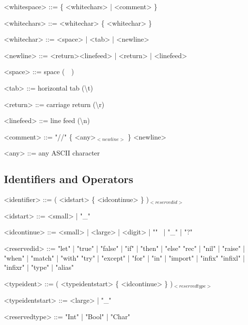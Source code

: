 \documentclass{article}
\begin{document}
\begin{grammar}
  <whitespace> ::= \{ <whitechars> | <comment> \}

  <whitechars> ::= <whitechar> \{ <whitechar> \}

  <whitechar> ::= <space> | <tab> | <newline>

  <newline> ::= <return><linefeed> | <return> | <linefeed>

  <space> ::= space (\textquotesingle \ \ \textquotesingle)

  <tab> ::= horizontal tab (\textquotesingle \textbackslash t\textquotesingle)

  <return> ::= carriage return (\textquotesingle \textbackslash r\textquotesingle)

  <linefeed> ::= line feed (\textquotesingle \textbackslash n\textquotesingle)
\end{grammar}

\begin{grammar}
  <comment> ::= "//" \{ <any>$_{<newline>}$ \} <newline>

  <any> ::= any ASCII character
\end{grammar}

\subsection{Identifiers and Operators}

\begin{grammar}
  <identifier> ::= ( <idstart> \{ <idcontinue> \} )$_{<reservedid>}$

  <idstart> ::= <small> | "_"

  <idcontinue> ::= <small> | <large> | <digit> | "\textquotesingle" \ | "_" | "?"
\end{grammar}

\begin{grammar}
  <reservedid> ::= "let" | "true" | "false" | "if" | "then" | "else"
  \alt "rec" | "nil" | "raise" | "when" | "match" | "with"
  \alt "try" | "except" | "for" | "in" | "import" | "infix"
  \alt "infixl" | "infixr" | "type" | "alias"
\end{grammar}

\begin{grammar}
  <typeident> ::= ( <typeidentstart> \{ <idcontinue> \} )$_{<reservedtype>}$

  <typeidentstart> ::= <large> | "_"

  <reservedtype> ::= "Int" | "Bool" | "Char"
\end{grammar}
\end{document}
